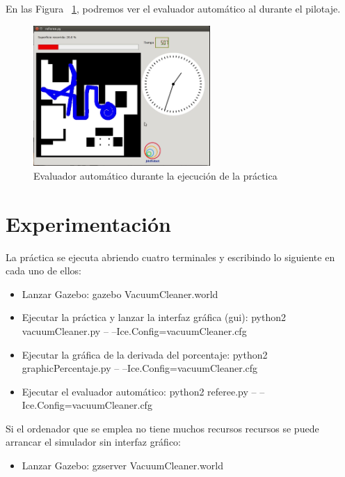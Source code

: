 En las Figura ~\ref{fig.Referee_Vacuum2}, podremos ver el evaluador automático al durante el pilotaje.

\begin{figure}[H]
  \begin{center}
    \includegraphics[width=0.6\textwidth]{figures/Vacuum/Referee_Vacuum2.png}
		\caption{Evaluador automático durante la ejecución de la práctica}
		\label{fig.Referee_Vacuum2}
		\end{center}
\end{figure}


\section{Experimentación}
La práctica se ejecuta abriendo cuatro terminales y escribindo lo siguiente en cada uno de ellos:

\begin{itemize}
\item Lanzar Gazebo: gazebo VacuumCleaner.world
\item	Ejecutar la práctica y lanzar la interfaz gráfica (\acrshort{gui}): python2 vacuumCleaner.py -- --Ice.Config=vacuumCleaner.cfg
\item	Ejecutar la gráfica de la derivada del porcentaje: python2 graphicPercentaje.py -- --Ice.Config=vacuumCleaner.cfg
\item	Ejecutar el evaluador automático: python2 referee.py -- --Ice.Config=vacuumCleaner.cfg

\end{itemize}

Si el ordenador que se emplea no tiene muchos recursos recursos se puede arrancar el simulador sin interfaz gráfico:

\begin{itemize}
\item Lanzar Gazebo: gzserver VacuumCleaner.world
\end{itemize}

